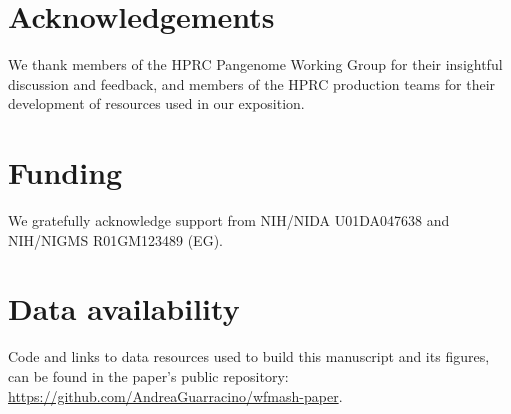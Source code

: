 \documentclass{bioinfo}
\begin{document}
\section*{Acknowledgements}

We thank members of the HPRC Pangenome Working Group for their insightful discussion and feedback, and members of the HPRC production teams for their development of resources used in our exposition.

\section*{Funding}

We gratefully acknowledge support from NIH/NIDA U01DA047638 and NIH/NIGMS R01GM123489 (EG).


\section*{Data availability}

Code and links to data resources used to build this manuscript and its figures, can be found in the paper's public repository: \url{https://github.com/AndreaGuarracino/wfmash-paper}.



%
%
%
%
%
%
%







\end{document}
